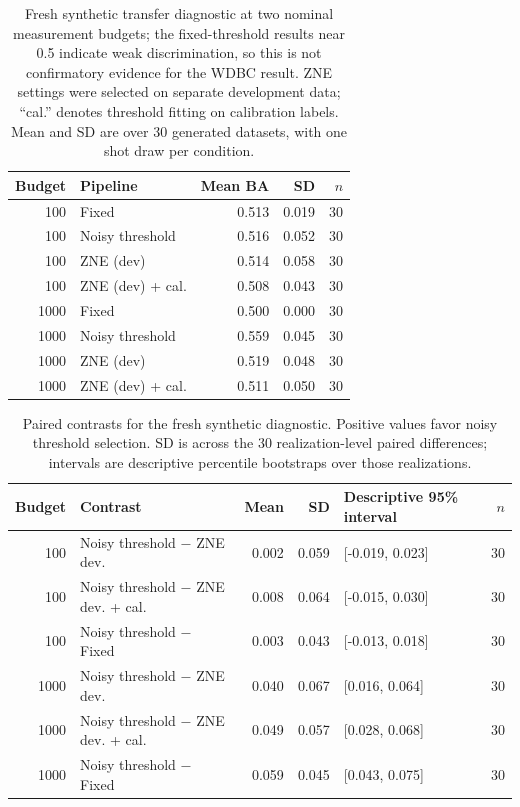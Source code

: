 \documentclass[10pt]{article}
\begin{document}
\begin{table}[t]\centering\small
\caption{Fresh synthetic transfer diagnostic at two nominal measurement budgets; the fixed-threshold results near 0.5 indicate weak discrimination, so this is not confirmatory evidence for the WDBC result. ZNE settings were selected on separate development data; ``cal.'' denotes threshold fitting on calibration labels. Mean and SD are over 30 generated datasets, with one shot draw per condition.}
\label{tab:fresh-diagnostic}
\begin{tabular}{@{}r l r r r@{}}\toprule
Budget & Pipeline & Mean BA & SD & $n$ \\
\midrule
100 & Fixed & 0.513 & 0.019 & 30 \\
100 & Noisy threshold & 0.516 & 0.052 & 30 \\
100 & ZNE (dev) & 0.514 & 0.058 & 30 \\
100 & ZNE (dev) + cal. & 0.508 & 0.043 & 30 \\
1000 & Fixed & 0.500 & 0.000 & 30 \\
1000 & Noisy threshold & 0.559 & 0.045 & 30 \\
1000 & ZNE (dev) & 0.519 & 0.048 & 30 \\
1000 & ZNE (dev) + cal. & 0.511 & 0.050 & 30 \\
\bottomrule\end{tabular}\end{table}

\begin{table}[t]\centering\scriptsize
\caption{Paired contrasts for the fresh synthetic diagnostic. Positive values favor noisy threshold selection. SD is across the 30 realization-level paired differences; intervals are descriptive percentile bootstraps over those realizations.}
\label{tab:confirm-paired}
\begin{tabular}{@{}r l r r l r@{}}\toprule
Budget & Contrast & Mean & SD & Descriptive 95\% interval & $n$ \\
\midrule
100 & Noisy threshold $-$ ZNE dev. & 0.002 & 0.059 & [-0.019, 0.023] & 30 \\
100 & Noisy threshold $-$ ZNE dev. + cal. & 0.008 & 0.064 & [-0.015, 0.030] & 30 \\
100 & Noisy threshold $-$ Fixed & 0.003 & 0.043 & [-0.013, 0.018] & 30 \\
1000 & Noisy threshold $-$ ZNE dev. & 0.040 & 0.067 & [0.016, 0.064] & 30 \\
1000 & Noisy threshold $-$ ZNE dev. + cal. & 0.049 & 0.057 & [0.028, 0.068] & 30 \\
1000 & Noisy threshold $-$ Fixed & 0.059 & 0.045 & [0.043, 0.075] & 30 \\
\bottomrule\end{tabular}\end{table}
\end{document}
